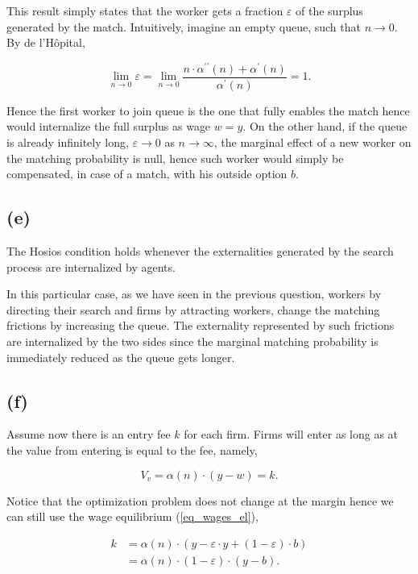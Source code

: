 \documentclass[american]{scrartcl}
\begin{document}
This result simply states that the worker gets a fraction $\varepsilon$ of the surplus generated by the match. Intuitively, imagine an empty queue, such that $n \xrightarrow{} 0$. By de l'Hôpital,

\begin{equation}
    \lim_{n \xrightarrow{} 0} \varepsilon = \lim_{n \xrightarrow{} 0} \frac{n \cdot \alpha^{\prime\prime}(n) + \alpha^\prime(n)}{\alpha^\prime(n)} = 1.
\end{equation}

Hence the first worker to join queue is the one that fully enables the match hence would internalize the full surplus as wage $w = y$. On the other hand, if the queue is already infinitely long, $\varepsilon \xrightarrow{} 0$ as $n \xrightarrow{} \infty$, the marginal effect of a new worker on the matching probability is null, hence such worker would simply be compensated, in case of a match, with his outside option $b$.

\subsection*{(e)}

The Hosios condition holds whenever the externalities generated by the search process are internalized by agents.

In this particular case, as we have seen in the previous question, workers by directing their search and firms by attracting workers, change the matching frictions by increasing the queue. The externality represented by such frictions are internalized by the two sides since the marginal matching probability is immediately reduced as the queue gets longer.

\subsection*{(f)}

Assume now there is an entry fee $k$ for each firm. Firms will enter as long as at the value from entering is equal to the fee, namely,

\begin{equation}
    V_v = \alpha(n) \cdot (y - w) = k.
\end{equation}

Notice that the optimization problem does not change at the margin hence we can still use the wage equilibrium (\ref{eq_wages_el}),

\begin{equation}
    \begin{split}
        k &= \alpha(n) \cdot(y - \varepsilon \cdot y + (1 - \varepsilon) \cdot b)\\
        &= \alpha(n) \cdot (1 - \varepsilon) \cdot (y - b).
    \end{split}
\end{equation}
\end{document}
